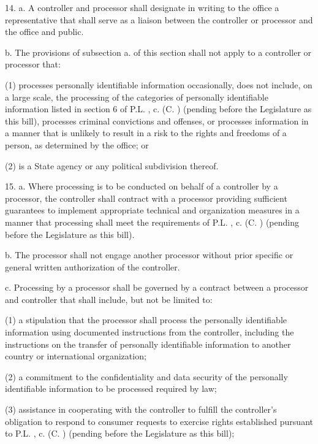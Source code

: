      14.  a.  A controller and processor shall designate in writing to the office a representative that shall serve as a liaison between the controller or processor and the office and public.

     b.    The provisions of subsection a. of this section shall not apply to a controller or processor that:

     (1)   processes personally identifiable information occasionally, does not include, on a large scale, the processing of the categories of personally identifiable information listed in section 6 of P.L.    , c.    (C.      ) (pending before the Legislature as this bill), processes criminal convictions and offenses, or processes information in a manner that is unlikely to result in a risk to the rights and freedoms of a person, as determined by the office; or

     (2)   is a State agency or any political subdivision thereof.

 

     15.  a.  Where processing is to be conducted on behalf of a controller by a processor, the controller shall contract with a processor providing sufficient guarantees to implement appropriate technical and organization measures in a manner that processing shall meet the requirements of P.L.    , c.    (C.      ) (pending before the Legislature as this bill).

     b.    The processor shall not engage another processor without prior specific or general written authorization of the controller.

     c.     Processing by a processor shall be governed by a contract between a processor and controller that shall include, but not be limited to:

     (1)   a stipulation that the processor shall process the personally identifiable information using documented instructions from the controller, including the instructions on the transfer of personally identifiable information to another country or international organization;

     (2)   a commitment to the confidentiality and data security of the personally identifiable information to be processed required by law;

     (3)   assistance in cooperating with the controller to fulfill the controller's obligation to respond to consumer requests to exercise rights established pursuant to P.L.    , c.    (C.      ) (pending before the Legislature as this bill);

